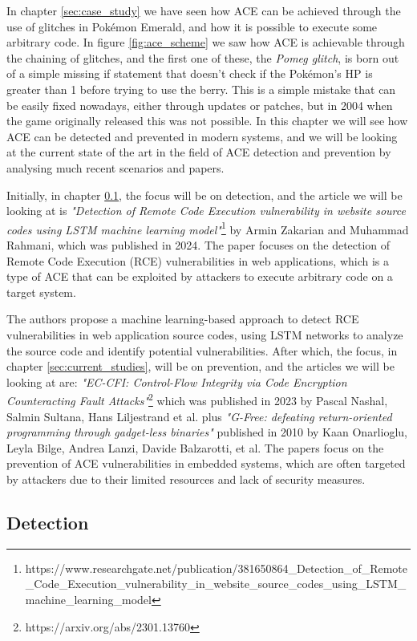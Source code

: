 \documentclass[a4paper]{usiinfbachelorproject}
\begin{document}
In chapter \ref{sec:case_study} we have seen how ACE can be achieved through the use of glitches in Pokémon Emerald, and how it is possible to execute some arbitrary code. In figure \ref{fig:ace_scheme} we saw how ACE is achievable through the chaining of glitches, and the first one of these, the \textit{Pomeg glitch}, is born out of a simple missing if statement that doesn't check if the Pokémon's HP is greater than 1 before trying to use the berry. This is a simple mistake that can be easily fixed nowadays, either through updates or patches, but in 2004 when the game originally released this was not possible. In this chapter we will see how ACE can be detected and prevented in modern systems, and we will be looking at the current state of the art in the field of ACE detection and prevention by analysing much recent scenarios and papers.

Initially, in chapter \ref{sec:today}, the focus will be on detection, and the article we will be looking at is \textit{"Detection of Remote Code Execution vulnerability in website source codes using LSTM machine learning model"}\footnote{https://www.researchgate.net/publication/381650864\_Detection\_of\_Remote\_Code\_Execution\_vulnerability\_in\_website\_source\_codes\_using\_LSTM\_machine\_learning\_model} by Armin Zakarian and Muhammad Rahmani, which was published in 2024. The paper focuses on the detection of Remote Code Execution (RCE) vulnerabilities in web applications, which is a type of ACE that can be exploited by attackers to execute arbitrary code on a target system.

The authors propose a machine learning-based approach to detect RCE vulnerabilities in web application source codes, using LSTM networks to analyze the source code and identify potential vulnerabilities.
After which, the focus, in chapter \ref{sec:current_studies}, will be on prevention, and the articles we will be looking at are: \textit{"EC-CFI: Control-Flow Integrity via Code Encryption Counteracting Fault Attacks"}\footnote{https://arxiv.org/abs/2301.13760} which was published in 2023 by Pascal Nashal, Salmin Sultana, Hans Liljestrand et al. plus \textit{"G-Free: defeating return-oriented programming through gadget-less binaries"} published in 2010 by Kaan Onarlioglu, Leyla Bilge, Andrea Lanzi, Davide Balzarotti, et al. The papers focus on the prevention of ACE vulnerabilities in embedded systems, which are often targeted by attackers due to their limited resources and lack of security measures.


\subsection{Detection}
\label{sec:today}
\end{document}
